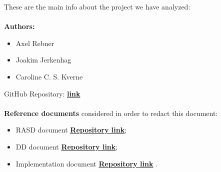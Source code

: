 These are the main info about the project we have analyzed: \\ \\
\textbf{Authors:}
\begin{itemize}
	\item Axel Rebner
	\item Joakim Jerkenhag
	\item Caroline C. S. Kverne
\end{itemize}
\noindent
GitHub Repository: {\href{https://github.com/Rebnersaurus/JerkenhagKverneRebner}{\color{blue}\textbf{link}}} 
\\ \\
\textbf{Reference documents} considered in order to redact this document:
\begin{itemize}
	\item RASD document {\href{https://github.com/Rebnersaurus/JerkenhagKverneRebner/blob/master/Final\%20Deliveries/RASD.pdf}{\color{blue}\textbf{Repository link}}};
	\item DD document {\href{https://github.com/Rebnersaurus/JerkenhagKverneRebner/blob/master/Final\%20Deliveries/DD.pdf}{\color{blue}\textbf{Repository link}}};
	\item Implementation document {\href{https://github.com/Rebnersaurus/JerkenhagKverneRebner/blob/master/Final\%20Deliveries/ImplementationDocument.pdf}{\color{blue}\textbf{Repository link}}} .
\end{itemize}